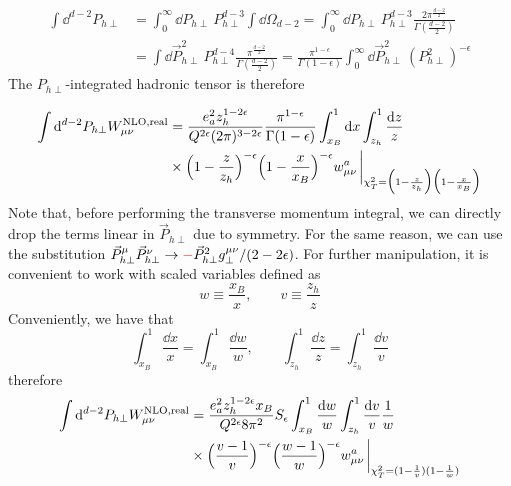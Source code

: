 \begin{equation}
\begin{aligned}
    \int \dd^{d-2}P_{h\perp}&=\int_0^\infty \dd P_{h\perp}\, P_{h\perp}^{d-3}\int \dd \Omega_{d-2}=\int_0^\infty \dd  P_{h\perp}\,P_{h\perp}^{d-3} \frac{2 \pi^{\frac{d-2}{2}}}{\Gamma(\frac{d-2}{2})}\\&=\int \dd \vec P_{h\perp}^2\,P_{h\perp}^{d-4}\frac{ \pi^{\frac{d-2}{2}}}{\Gamma(\frac{d-2}{2})}=\frac{\pi^{1-\epsilon}}{\Gamma(1-\epsilon)}\int_0^\infty\dd \vec P_{h\perp}^2 \, (P_{h\perp}^2)^{-\epsilon}
\end{aligned}
\end{equation}
The $P_{h\perp}$-integrated hadronic tensor is therefore

\begin{equation}
    \begin{aligned}
        \int \dd^{d-2}P_{h\perp} W_{\mu\nu}^{\text{NLO,real}}&=\frac{e_a^2z_h^{1-2\epsilon}}{Q^{2\epsilon}(2\pi)^{3-2\epsilon}}\frac{\pi^{1-\epsilon}}{\Gamma(1-\epsilon)}   \int_{x_B}^{1} \dd x\int_{z_h}^{1}  \frac{\dd z}{z}\\
      &\times \Big(1-\frac{z}{z_h} \Big)^{-\epsilon}\Big(1-\frac{x}{x_B}\Big)^{-\epsilon} w_{\mu\nu}^a\eval_{\chi_T^2=\Big(1-\frac{z}{z_h} \Big)\Big(1-\frac{x}{x_B}\Big)}
    \end{aligned}
\end{equation}
Note that, before performing the transverse momentum integral, we can directly drop the terms linear in $\vec P_{h\perp}$ due to symmetry. For the same reason, we can use the substitution $\vec P_{h\perp}^\mu\vec P_{h\perp}^\nu\to \textcolor{red}{-}\vec P_{h\perp}^2 g_\perp^{\mu\nu}/{(2-2\epsilon)}$. For further manipulation, it is convenient to work with scaled variables defined as
\begin{equation}
    w\equiv\frac{x_B}{x},\qquad v\equiv\frac{z_h}{z} 
\end{equation}
Conveniently, we have that
\begin{equation}
    \int_{x_B}^1\frac{\dd x}{x}=\int_{x_B}^1\frac{\dd w}{w}, \qquad \int_{z_h}^1\frac{\dd z}{z}=\int_{z_h}^1\frac{\dd v}{v}
\end{equation}
therefore 
\begin{equation}
    \begin{aligned}
         \int \dd^{d-2}P_{h\perp} W_{\mu\nu}^{\text{NLO,real}}&=\frac{e_a^2z_h^{1-2\epsilon} x_B}{Q^{2\epsilon}8\pi^2}S_\epsilon    \int_{x_B}^{1} \frac{\dd w}{w}\int_{z_h}^{1}  \frac{\dd v}{v}\frac{1}{w}\\
      &\times \Big(\frac{v-1}{v} \Big)^{-\epsilon}\Big(\frac{w-1}{w}\Big)^{-\epsilon}w_{\mu\nu}^a\eval_{\chi_T^2=(1-\frac{1}{v})(1-\frac{1}{w})}  
    \end{aligned}
\end{equation}
